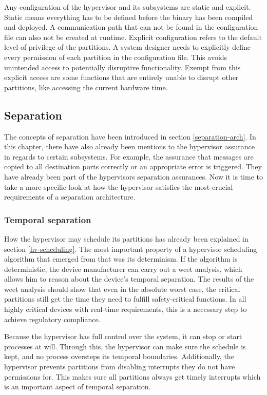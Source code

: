 Any configuration of the hypervisor and its subsystems are static and explicit. Static means everything has to be defined before the binary has been compiled and deployed. A communication path that can not be found in the configuration file can also not be created at runtime. Explicit configuration refers to the default level of privilege of the partitions. A system designer needs to explicitly define every permission of each partition in the configuration file. This avoids unintended access to potentially disruptive functionality. Exempt from this explicit access are some functions that are entirely unable to disrupt other partitions, like accessing the current hardware time.

\subsection{Separation}
The concepts of separation have been introduced in section \ref{separation-arch}. In this chapter, there have also already been mentions to the hypervisor assurance in regards to certain subsystems. For example, the assurance that messages are copied to all destination ports correctly or an appropriate error is triggered. They have already been part of the hypervisors separation assurances. Now it is time to take a more specific look at how the hypervisor satisfies the most crucial requirements of a separation architecture. 

\subsubsection{Temporal separation}
How the hypervisor may schedule its partitions has already been explained in section \ref{hv-scheduling}. The most important property of a hypervisor scheduling algorithm that emerged from that was its determinism. If the algorithm is deterministic, the device manufacturer can carry out a \acrshort{wcet} analysis, which allows him to reason about the device's temporal separation. The results of the \acrshort{wcet} analysis should show that even in the absolute worst case, the critical partitions still get the time they need to fulfill safety-critical functions. In all highly critical devices with real-time requirements, this is a necessary step to achieve regulatory compliance.

Because the hypervisor has full control over the system, it can stop or start processes at will. Through this, the hypervisor can make sure the schedule is kept, and no process oversteps its temporal boundaries.
Additionally, the hypervisor prevents partitions from disabling interrupts they do not have permissions for. This makes sure all partitions always get timely interrupts which is an important aspect of temporal separation. 
